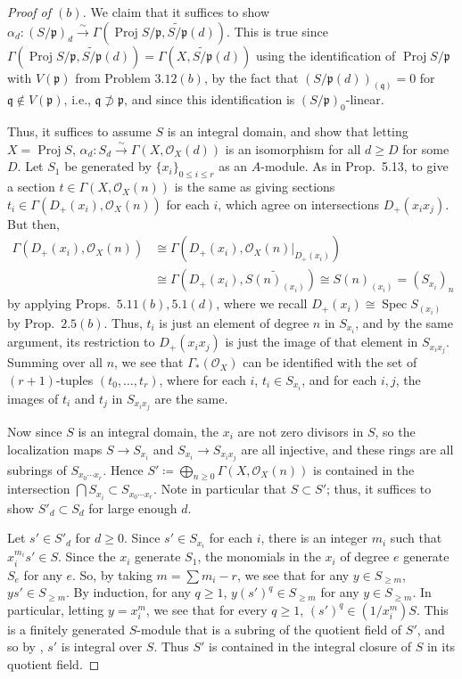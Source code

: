 \documentclass[12pt,letterpaper]{article}
\theoremstyle{definition}
\theoremstyle{remark}
\numberwithin{equation}{section}
\numberwithin{figure}{problem}
\DeclareMathOperator{\Spec}{Spec}
\DeclareMathOperator{\Proj}{Proj}
\newcommand{\OO}{\mathcal{O}}
\newcommand{\isoto}{\overset{\sim}{\to}}
\begin{document}
\begin{proof}[Proof of $(b)$]
  \par We claim that it suffices to show $\alpha_d\colon(S/\mathfrak{p})_{d} \isoto \Gamma(\Proj S/\mathfrak{p},\widetilde{S/\mathfrak{p}}(d))$. This is true since $\Gamma(\Proj S/\mathfrak{p},\widetilde{S/\mathfrak{p}}(d)) = \Gamma(X,\widetilde{S/\mathfrak{p}}(d))$ using the identification of $\Proj S/\mathfrak{p}$ with $V(\mathfrak{p})$ from Problem $3.12(b)$, by the fact that $(S/\mathfrak{p}(d))_{(\mathfrak{q})} = 0$ for $\mathfrak{q} \notin V(\mathfrak{p})$, i.e., $\mathfrak{q} \not\supset \mathfrak{p}$, and since this identification is $(S/\mathfrak{p})_0$-linear.
  \par Thus, it suffices to assume $S$ is an integral domain, and show that letting $X = \Proj S$, $\alpha_d\colon S_d \isoto \Gamma(X,\OO_X(d))$ is an isomorphism for all $d \ge D$ for some $D$. Let $S_1$ be generated by $\{x_i\}_{0\le i\le r}$ as an $A$-module. As in Prop.~5.13, to give a section $t \in \Gamma(X,\OO_X(n))$ is the same as giving sections $t_i \in \Gamma(D_+(x_i),\OO_X(n))$ for each $i$, which agree on intersections $D_+(x_ix_j)$. But then,
  \begin{align*}
    \Gamma(D_+(x_i),\OO_X(n)) &\cong \Gamma(D_+(x_i),\OO_X(n)\vert_{D_+(x_i)})\\
    &\cong \Gamma(D_+(x_i),\widetilde{S(n)_{(x_i)}}) \cong S(n)_{(x_i)} = (S_{x_i})_n
  \end{align*}
  by applying Props.~$5.11(b),5.1(d)$, where we recall $D_+(x_i) \cong \Spec S_{(x_i)}$ by Prop.~$2.5(b)$. Thus, $t_i$ is just an element of degree $n$ in $S_{x_i}$, and by the same argument, its restriction to $D_+(x_ix_j)$ is just the image of that element in $S_{x_ix_j}$. Summing over all $n$, we see that $\Gamma_*(\OO_X)$ can be identified with the set of $(r+1)$-tuples $(t_0,\ldots,t_r)$, where for each $i$, $t_i \in S_{x_i}$, and for each $i,j$, the images of $t_i$ and $t_j$ in $S_{x_ix_j}$ are the same.
  \par Now since $S$ is an integral domain, the $x_i$ are not zero divisors in $S$, so the localization maps $S \to S_{x_i}$ and $S_{x_i} \to S_{x_ix_j}$ are all injective, and these rings are all subrings of $S_{x_0\cdots x_r}$. Hence $S' \coloneqq \bigoplus_{n \ge 0}\Gamma(X,\OO_X(n))$ is contained in the intersection $\bigcap S_{x_i} \subset S_{x_0\cdots x_r}$. Note in particular that $S \subset S'$; thus, it suffices to show $S'_d \subset S_d$ for large enough $d$.
  \par Let $s' \in S'_d$ for $d \ge 0$. Since $s' \in S_{x_i}$ for each $i$, there is an integer $m_i$ such that $x_i^{m_i}s' \in S$. Since the $x_i$ generate $S_1$, the monomials in the $x_i$ of degree $e$ generate $S_e$ for any $e$. So, by taking $m = \sum m_i - r$, we see that for any $y \in S_{\ge m}$, $ys' \in S_{\ge m}$. By induction, for any $q \ge 1$, $y(s')^q \in S_{\ge m}$ for any $y \in S_{\ge m}$. In particular, letting $y = x_i^m$, we see that for every $q \ge 1$, $(s')^q \in (1/x_i^m)S$. This is a finitely generated $S$-module that is a subring of the quotient field of $S'$, and so by \cite[Prop.~5.1]{AM69}, $s'$ is integral over $S$. Thus $S'$ is contained in the integral closure of $S$ in its quotient field.

\end{proof}
\end{document}
